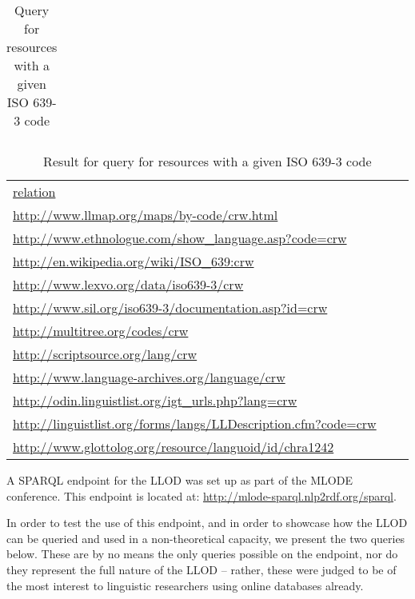 
\begin{center}
\begin{table*}[t!hbp]
\caption{Query for resources with a given ISO 639-3 code} \label{t1}
\begin{tabular}{lll}
\hline
{\footnotesize } \\
\hline
\end{tabular}
\end{table*}
\end{center}

\begin{table*}[b!htp]
\caption{Result for query for resources with a given ISO 639-3 code} \label{t1}
\begin{tabular}{lll}
\hline
\url{relation} \\
\url{http://www.llmap.org/maps/by-code/crw.html} \\
\url{http://www.ethnologue.com/show_language.asp?code=crw} \\
\url{http://en.wikipedia.org/wiki/ISO_639:crw} \\
\url{http://www.lexvo.org/data/iso639-3/crw} \\
\url{http://www.sil.org/iso639-3/documentation.asp?id=crw} \\
\url{http://multitree.org/codes/crw} \\
\url{http://scriptsource.org/lang/crw} \\
\url{http://www.language-archives.org/language/crw} \\
\url{http://odin.linguistlist.org/igt_urls.php?lang=crw} \\
\url{http://linguistlist.org/forms/langs/LLDescription.cfm?code=crw} \\
\url{http://www.glottolog.org/resource/languoid/id/chra1242} \\
\hline
\end{tabular}
\end{table*}

A SPARQL endpoint for the LLOD was set up as part of the MLODE conference. This endpoint is located at: \url{http://mlode-sparql.nlp2rdf.org/sparql}. 

In order to test the use of this endpoint, and in order to showcase how the LLOD can be queried and used in a non-theoretical capacity, we present the two queries below. These are by no means the only queries possible on the endpoint, nor do they represent the full nature of the LLOD -- rather, these were judged to be of the most interest to linguistic researchers using online databases already. 


